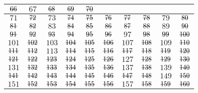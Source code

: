 \begin{mdframed}[style=darkAnswer,frametitle={Joe Starr}]
\begin{center}
\begin{tabular}{| c | c | c | c | c | c | c | c | c | c |}
      $\msout{66}$  & $67$          & $\msout{68}$  & $\msout{69}$  & $\msout{70}$                                        \\
      \hline
      $71$          & $\msout{72}$  & $73$          & $\msout{74}$  & $\msout{75}$  & $\msout{76}$
                    & $\msout{77}$  & $\msout{78}$  & $79$          & $\msout{80}$                                        \\
      \hline
      $\msout{81}$  & $\msout{82}$  & $83$          & $\msout{84}$  & $\msout{85}$  &
      $\msout{86}$  & $\msout{87}$  & $\msout{88}$  & $89$          & $\msout{90}$                                        \\
      \hline
      $\msout{91}$  & $\msout{92}$  & $\msout{93}$  & $\msout{94}$  & $\msout{95}$
                    & $\msout{96}$  & $97$          & $\msout{98}$  & $\msout{99}$  & $\msout{100}$                       \\
      \hline
      $101$         & $\msout{102}$ & $103$         & $\msout{104}$ & $\msout{105}$ &
      $\msout{106}$ & $107$         & $\msout{108}$ & $109$         & $\msout{110}$                                       \\
      \hline
      $\msout{111}$ & $\msout{112}$ & $113$         & $\msout{114}$ & $\msout{115}$ &
      $\msout{116}$ & $\msout{117}$ & $\msout{118}$ & $\msout{119}$ &
      $\msout{120}$                                                                                                       \\
      \hline
      $\msout{121}$ & $\msout{122}$ & $\msout{123}$ & $\msout{124}$ &
      $\msout{125}$ & $\msout{126}$ & $127$         & $\msout{128}$ & $\msout{129}$ &
      $\msout{130}$                                                                                                       \\
      \hline
      $131$         & $\msout{132}$ & $\msout{133}$ & $\msout{134}$ & $\msout{135}$ &
      $\msout{136}$ & $137$         & $\msout{138}$ & $139$         & $\msout{140}$                                       \\
      \hline
      $\msout{141}$ & $\msout{142}$ & $\msout{143}$ & $\msout{144}$ &
      $\msout{145}$ & $\msout{146}$ & $\msout{147}$ & $\msout{148}$ & $149$         &
      $\msout{150}$                                                                                                       \\
      \hline
      $151$         & $\msout{152}$ & $\msout{153}$ & $\msout{154}$ & $\msout{155}$ &
      $\msout{156}$ & $157$         & $\msout{158}$ & $\msout{159}$ & $\msout{160}$                                       \\

\end{tabular}
\end{center}
\end{mdframed}
